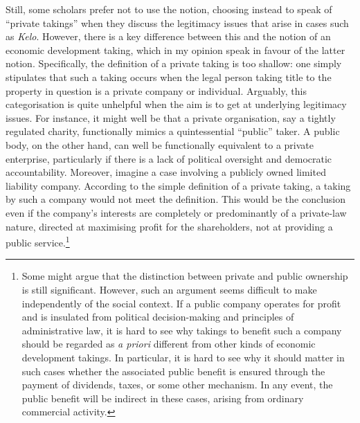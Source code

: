 Still, some scholars prefer not to use the notion, choosing instead to speak of ``private takings'' when they discuss the legitimacy issues that arise in cases such as {\it Kelo}. However, there is a key difference between this and the notion of an economic development taking, which in my opinion speak in favour of the latter notion. %
Specifically, the definition of a private taking is too shallow: one simply stipulates that such a taking occurs when the legal person taking title to the property in question is a private company or individual. Arguably, this categorisation is quite unhelpful when the aim is to get at underlying legitimacy issues. For instance, it might well be that a private organisation, say a tightly regulated charity, functionally mimics a quintessential ``public'' taker. A public body, on the other hand, can well be functionally equivalent to a private enterprise, particularly if there is a lack of political oversight and democratic accountability. Moreover, imagine a case involving a publicly owned limited liability company. According to the simple definition of a private taking, a taking by such a company would not meet the definition. This would be the conclusion even if the company's interests are completely or predominantly of a private-law nature, directed at maximising profit for the shareholders, not at providing a public service.\footnote{Some might argue that the distinction between private and public ownership is still significant. However, such an argument seems difficult to make independently of the social context. If a public company operates for profit and is insulated from political decision-making and principles of administrative law, it is hard to see why takings to benefit such a company should be regarded as {\it a priori} different from other kinds of economic development takings. In particular, it is hard to see why it should matter in such cases whether the associated public benefit is ensured through the payment of dividends, taxes, or some other mechanism. In any event, the public benefit will be indirect in these cases, arising from ordinary commercial activity.}


